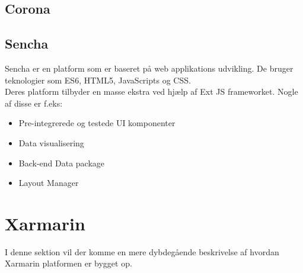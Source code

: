 \subsection{Corona}

\subsection{Sencha}
Sencha er en platform som er baseret på web applikations udvikling. De bruger teknologier som ES6\cite{ES6}, HTML5\cite{HTML5}, JavaScripts\cite{JavaScript} og CSS\cite{CSS}. \\
Deres platform tilbyder en masse ekstra ved hjælp af Ext JS frameworket. Nogle af disse er f.eks:
\begin{itemize}[-]
	\item Pre-integrerede og testede UI komponenter
	\item Data visualisering
	\item Back-end Data package
	\item Layout Manager
\end{itemize}

\section{Xarmarin}
I denne sektion vil der komme en mere dybdegående beskrivelse af hvordan Xarmarin platformen er bygget op.